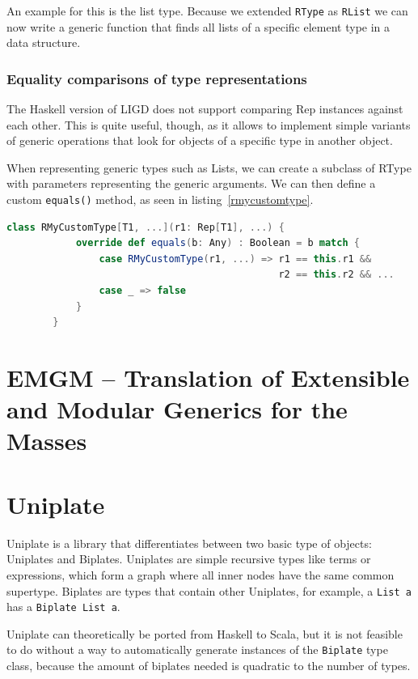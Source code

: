 \documentclass[abstracton,parskip=half]{scrreprt}
\newcommand{\cd}{\texttt}
\begin{document}
    An example for this is the list type. Because we extended \cd{RType} as
    \cd{RList} we can now write a generic function that finds all lists of a
    specific element type in a data structure.

    \subsubsection{Equality comparisons of type representations}
    The Haskell version of LIGD does not support comparing Rep instances
    against each other. This is quite useful, though, as it allows to
    implement simple variants of generic operations that look for objects
    of a specific type in another object.


    When representing generic types such as Lists, we can create a subclass
    of RType with parameters representing the generic arguments. We can then
    define a custom \cd{equals()} method, as seen in listing~\ref{rmycustomtype}.

    \begin{lstlisting}[language=Scala,gobble=8,float,caption=Representing custom generic types,label=rmycustomtype]
        class RMyCustomType[T1, ...](r1: Rep[T1], ...) {
            override def equals(b: Any) : Boolean = b match {
                case RMyCustomType(r1, ...) => r1 == this.r1 &&
                                               r2 == this.r2 && ...
                case _ => false
            }
        }
    \end{lstlisting}



    \section{EMGM -- Translation of Extensible and Modular Generics for the Masses}

    \section{Uniplate}
    Uniplate is a library that differentiates between two basic type of
    objects: Uniplates and Biplates. Uniplates are simple recursive types
    like terms or expressions, which form a graph where all inner nodes have
    the same common supertype. Biplates are types that contain other Uniplates,
    for example, a \cd{List a} has a \cd{Biplate List a}.


    Uniplate can theoretically be ported from Haskell to Scala, but it is not
    feasible to do without a way to automatically generate instances of the
    \cd{Biplate} type class, because the amount of biplates needed is quadratic
    to the number of types.
\end{document}
